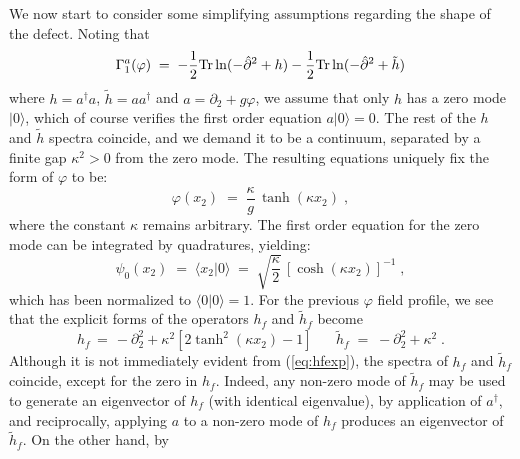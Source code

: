 \documentclass[a4paper,12pt]{article}
\begin{document}
We now start to consider some simplifying assumptions regarding the
shape of the defect. Noting that
\begin{equation}
  \label{eq:gma12}
\Gamma_1^a(\varphi) \;=\; -\frac{1}{2} {\rm Tr} \ln ( -{\hat \partial}^2 + h )
-\frac{1}{2} {\rm Tr} \ln ( -{\hat \partial}^2 + {\tilde h} )
\end{equation}
where $h=a^\dagger a$, ${\tilde h}=a a^\dagger$ and $a=\partial_2 + g \varphi$, we assume that
only $h$ has a zero mode $|0\rangle$, which of course verifies the first
order equation $a |0\rangle = 0$. The rest of the $h$ and ${\tilde h}$
spectra coincide, and we demand it to be a continuum, separated by a
finite gap $\kappa^2>0$ from the zero mode.  The resulting equations
uniquely fix the form of $\varphi$ to be:
\begin{equation}
  \label{eq:tanh}
\varphi(x_2) \;=\; \frac{\kappa}{g} \, \tanh (\kappa x_2) \;,
\end{equation}    
where the constant $\kappa$ remains arbitrary. The first order equation 
for the zero mode can be integrated by quadratures, yielding:
\begin{equation}
  \label{eq:zm}
\psi_0(x_2)\;=\; \langle x_2|0\rangle \;=\; \sqrt{\frac{\kappa}{2}} \, [\cosh(\kappa x_2)]^{-1} \;, 
\end{equation}
which has been normalized to $\langle0|0\rangle=1$.
For the previous $\varphi$ field profile, we see that the explicit forms 
of the operators $h_f$ and ${\tilde h}_f$ become
\begin{equation}
  \label{eq:hfexp} 
h_f\,=\, -\partial_2^2 + \kappa^2 [ 2 \tanh^2(\kappa x_2) - 1]
\;\;\;\;\;\;
{\tilde h}_f\;=\; -\partial_2^2 + \kappa^2 \;.
\end{equation}
Although it is not immediately evident from (\ref{eq:hfexp}), the 
spectra of $h_f$ and ${\tilde h}_f$ coincide, except for the zero in $h_f$.
Indeed, any non-zero mode of ${\tilde h}_f$ may be used to generate an 
eigenvector of $h_f$ (with identical eigenvalue), by application of 
$a^\dagger$, and reciprocally, applying $a$ to a non-zero mode of $h_f$
produces an eigenvector of ${\tilde h}_f$. On the other hand, by 
\end{document}
